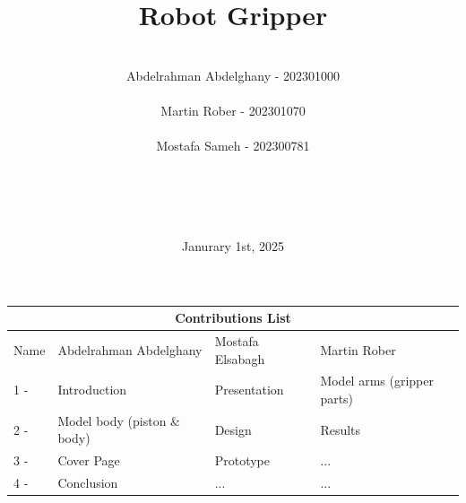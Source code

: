 \documentclass{article}
\title{Robot Gripper}
\author{ \\ Abdelrahman Abdelghany - 202301000 \\ \\ Martin Rober - 202301070 \\ \\ Mostafa Sameh - 202300781 \\ \\ \\ \\ \\  }
\date{Janurary 1st, 2025}
\begin{document}
\maketitle

\newpage
\begin{tabular}{ |p{1cm}||p{5cm}|p{3cm}|p{3cm}|}
    \hline
    \multicolumn{4}{|c|}{Contributions List} \\
    \hline
    Name & Abdelrahman Abdelghany & Mostafa Elsabagh & Martin Rober \\
    \hline
   
   1 - & Introduction & Presentation & Model arms (gripper parts) \\
   2 - & Model body (piston \& body)  & Design & Results \\
   3 - & Cover Page  & Prototype & ... \\
   4 - & Conclusion  & ... & ... \\
    \hline
   \end{tabular}
   \newpage

\newpage
\end{document}
